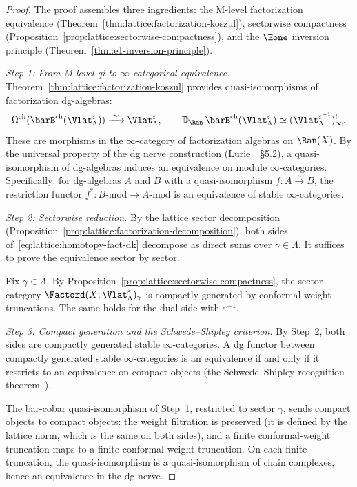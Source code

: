 \begin{proof}
The proof assembles three ingredients: the M-level factorization
equivalence (Theorem~\ref{thm:lattice:factorization-koszul}),
sectorwise compactness
(Proposition~\ref{prop:lattice:sectorwise-compactness}), and the
$\Eone$ inversion principle
(Theorem~\ref{thm:e1-inversion-principle}).

\emph{Step 1: From M-level qi to $\infty$-categorical equivalence.}
Theorem~\ref{thm:lattice:factorization-koszul} provides
quasi-isomorphisms of factorization dg-algebras:
\[
\Omega^{\mathrm{ch}}(\barB^{\mathrm{ch}}(\Vlat_\Lambda^\varepsilon))
\xrightarrow{\;\sim\;} \Vlat_\Lambda^\varepsilon,
\qquad
\mathbb{D}_{\Ran}\, \barB^{\mathrm{ch}}(\Vlat_\Lambda^\varepsilon)
\simeq (\Vlat_\Lambda^{\varepsilon^{-1}})^!_\infty.
\]
These are morphisms in the $\infty$-category of factorization
algebras on $\Ran(X)$. By the universal property of the dg nerve
construction (Lurie~\cite{HA}~\S5.2), a quasi-isomorphism
of dg-algebras induces an equivalence on module
$\infty$-categories. Specifically: for dg-algebras $A$ and $B$
with a quasi-isomorphism $f\colon A \xrightarrow{\sim} B$, the
restriction functor $f^*\colon B\text{-mod} \to A\text{-mod}$
is an equivalence of stable $\infty$-categories.

\emph{Step 2: Sectorwise reduction.}
By the lattice sector decomposition
(Proposition~\ref{prop:lattice:factorization-decomposition}),
both sides of~\eqref{eq:lattice:homotopy-fact-dk} decompose as
direct sums over $\gamma \in \Lambda$. It suffices to prove the
equivalence sector by sector.

Fix $\gamma \in \Lambda$. By
Proposition~\ref{prop:lattice:sectorwise-compactness}, the sector
category $\Factord(X; \Vlat_\Lambda^\varepsilon)_\gamma$ is
compactly generated by conformal-weight truncations. The same holds
for the dual side with
$\varepsilon^{-1}$.

\emph{Step 3: Compact generation and the Schwede--Shipley criterion.}
By Step~2, both sides are compactly generated stable
$\infty$-categories. A dg functor between compactly generated
stable $\infty$-categories is an equivalence if and only if it
restricts to an equivalence on compact objects (the
Schwede--Shipley recognition theorem~\cite{SS03}).

The bar-cobar quasi-isomorphism of Step~1, restricted to sector
$\gamma$, sends compact objects to compact objects: the weight
filtration is preserved (it is defined by the lattice norm, which
is the same on both sides), and a finite conformal-weight truncation
maps to a finite conformal-weight truncation. On each finite
truncation, the quasi-isomorphism is a quasi-isomorphism of chain
complexes, hence an equivalence in the dg nerve.


\end{proof}
